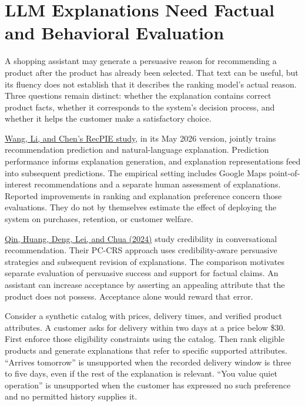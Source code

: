 \hypertarget{M07-llm-explanations-need-factual-and-behavioral-evaluation}{%
\section{LLM Explanations Need Factual and Behavioral
Evaluation}\label{M07-llm-explanations-need-factual-and-behavioral-evaluation}}

\noindent A shopping assistant may generate a persuasive reason for recommending a
product after the product has already been selected. That text can be
useful, but its fluency does not establish that it describes the ranking
model's actual reason. Three questions remain distinct: whether the
explanation contains correct product facts, whether it corresponds to
the system's decision process, and whether it helps the customer make a
satisfactory choice.

\href{https://arxiv.org/abs/2502.16759v3}{Wang, Li, and Chen's RecPIE
study}, in its May 2026 version, jointly trains recommendation
prediction and natural-language explanation. Prediction performance
informs explanation generation, and explanation representations feed
into subsequent predictions. The empirical setting includes Google Maps
point-of-interest recommendations and a separate human assessment of
explanations. Reported improvements in ranking and explanation
preference concern those evaluations. They do not by themselves estimate
the effect of deploying the system on purchases, retention, or customer
welfare.

\href{https://aclanthology.org/2024.findings-emnlp.247/}{Qin, Huang,
Deng, Lei, and Chua (2024)} study credibility in conversational
recommendation. Their PC-CRS approach uses credibility-aware persuasive
strategies and subsequent revision of explanations. The comparison
motivates separate evaluation of persuasive success and support for
factual claims. An assistant can increase acceptance by asserting an
appealing attribute that the product does not possess. Acceptance alone
would reward that error.

Consider a synthetic catalog with prices, delivery times, and verified
product attributes. A customer asks for delivery within two days at a
price below \$30. First enforce those eligibility constraints using the
catalog. Then rank eligible products and generate explanations that
refer to specific supported attributes. ``Arrives tomorrow'' is
unsupported when the recorded delivery window is three to five days,
even if the rest of the explanation is relevant. ``You value quiet
operation'' is unsupported when the customer has expressed no such
preference and no permitted history supplies it.

